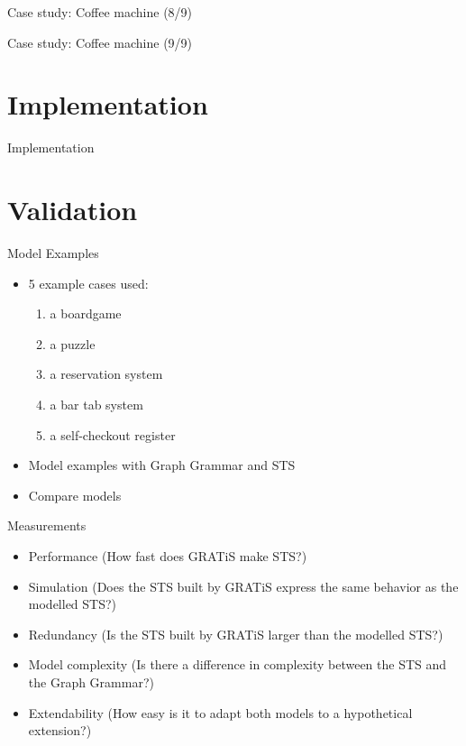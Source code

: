 \documentclass{FMTslides}
\begin{document}
\begin{frame}{Case study: Coffee machine (8/9)}
\begin{figure}

\end{figure}
\end{frame}

\begin{frame}{Case study: Coffee machine (9/9)}
\begin{figure}

\end{figure}
\end{frame}

\section[Implementation]{Implementation}

\begin{frame}{Implementation}
\begin{figure}

\end{figure}
\end{frame}

\section[Validation]{Validation}

\begin{frame}{Model Examples}
\begin{itemize}
  \item 5 example cases used:
  \begin{enumerate}
    \item a boardgame
    \item a puzzle
    \item a reservation system
    \item a bar tab system
    \item a self-checkout register
  \end{enumerate}
  \item Model examples with Graph Grammar and STS
  \item Compare models
\end{itemize}
\end{frame}

\begin{frame}{Measurements}
  \begin{itemize}
  \item Performance (How fast does GRATiS make STS?)
  \item Simulation (Does the STS built by GRATiS express the same behavior as the modelled STS?)
  \item Redundancy (Is the STS built by GRATiS larger than the modelled STS?)
  \item Model complexity (Is there a difference in complexity between the STS and the Graph Grammar?)
  \item Extendability (How easy is it to adapt both models to a hypothetical extension?)
  \end{itemize}
\end{frame}
\end{document}

